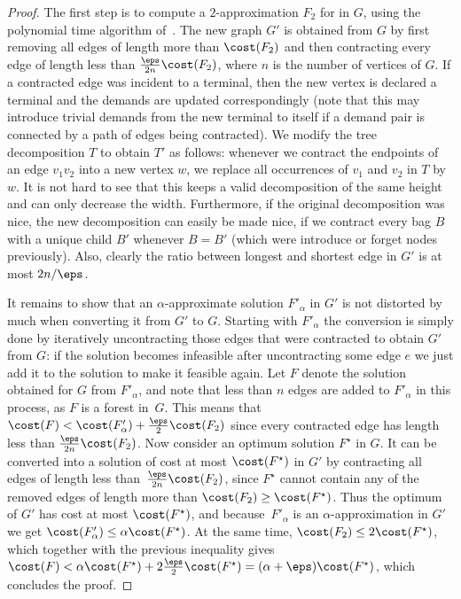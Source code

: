 %
\begin{proof}%
The first
step is to compute a $2$-approximation $F_2$ for \SF in $G$, using the
polynomial time algorithm of~\cite{agrawal1991trees}.  The new graph $G'$ is
obtained from $G$ by first removing all edges of length more than $\cost(F_2)$
and then contracting every edge of length less than
$\frac{\eps}{2n}\cost(F_2)$, where $n$ is the number of vertices of $G$.  If a
contracted edge was incident to a terminal, then the new vertex is declared a
terminal and the demands are updated correspondingly (note that this may
introduce trivial demands from the new terminal to itself if a demand pair is
connected by a path of edges being contracted).  We modify the tree
decomposition $T$ to obtain $T'$ as follows: whenever we contract the endpoints
of an edge $v_1v_2$ into a new vertex $w$, we replace all occurrences of $v_1$
and $v_2$ in $T$ by $w$. It is not hard to see that this keeps a valid decomposition
of the same height and can only decrease the width. Furthermore, if the
original decomposition was nice, the new decomposition can easily be made nice, 
if we contract every bag $B$ with a unique child $B'$
whenever $B=B'$ (which were introduce or forget nodes previously). 
Also, clearly the ratio between longest and shortest edge in
$G'$ is at most $2n/\eps$.

It remains to show that an $\alpha$-approximate solution $F'_\alpha$ in $G'$ is not distorted by much when converting it 
from $G'$ to $G$. Starting with $F'_\alpha$ the conversion is simply done by iteratively uncontracting those edges that were contracted to obtain $G'$ from $G$: 
if the solution becomes infeasible after uncontracting some edge $e$ we just add it to the solution to make it feasible again. 
Let $F$ denote the solution obtained for $G$ from $F'_\alpha$, and note that less than $n$ edges are added to $F'_\alpha$ in this process, as $F$ is a forest in~$G$.
This means that $\cost(F)<\cost(F'_\alpha)+\frac{\eps}{2}\cost(F_2)$ since every contracted edge has length less than $\frac{\eps}{2n}\cost(F_2)$.
Now consider an optimum solution $F^\star$ in $G$. It can be converted into a solution of cost at most $\cost(F^\star)$ in $G'$ by contracting all edges of length less than~$\frac{\eps}{2n}\cost(F_2)$, 
since $F^\star$ cannot contain any of the removed edges of length more than $\cost(F_2)\geq\cost(F^\star)$.
Thus the optimum of $G'$ has cost at most $\cost(F^\star)$, and because~$F'_\alpha$ is an $\alpha$-approximation in $G'$ we get $\cost(F'_\alpha)\leq\alpha\cost(F^\star)$. 
At the same time, $\cost(F_2)\leq 2\cost(F^\star)$, which together with the previous inequality gives 
$\cost(F)<\alpha\cost(F^\star)+2\frac{\eps}{2}\cost(F^\star)=(\alpha+\eps)\cost(F^\star)$, which concludes the proof.
\end{proof}    
%

